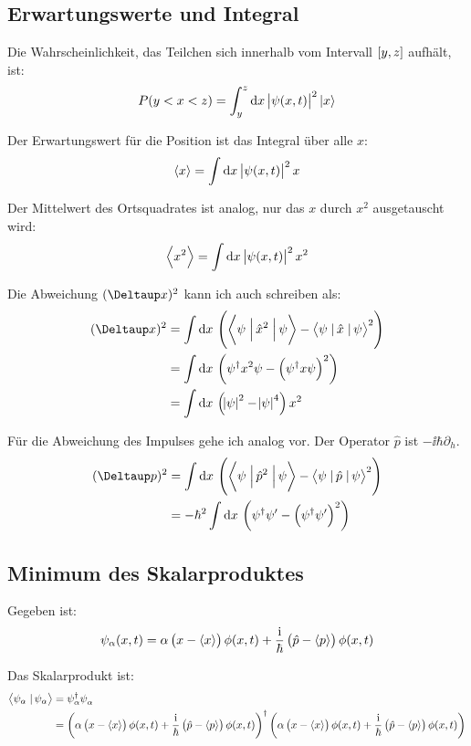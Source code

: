 \subsection{Erwartungswerte und Integral}

Die Wahrscheinlichkeit, das Teilchen sich innerhalb vom Intervall $\intcc{y,
z}$ aufhält, ist:
\[
	P(y < x < z) = \int_y^z \dif x \, \abs{\psi(x, t)}^2 \ket x
\]

Der Erwartungswert für die Position ist das Integral über alle $x$:
\[
	\bracket x = \int\dif x \, \abs{\psi(x, t)}^2 x
\]

Der Mittelwert des Ortsquadrates ist analog, nur das $x$ durch $x^2$
ausgetauscht wird:
\[
	\bracket{x^2} = \int\dif x \, \abs{\psi(x, t)}^2 x^2
\]

Die Abweichung $(\Deltaup x)^2$ kann ich auch schreiben als:
\cite{wikipedia-quantum_operators}
\begin{align*}
	(\Deltaup x)^2
	&= \int \dif x \, \del{\braproket{\psi}{\hat x^2}{\psi} - \braproket{\psi}{\hat x}{\psi}^2} \\
	&= \int \dif x \, \del{\psi^\dagger x^2 \psi - \del{\psi^\dagger x \psi}^2} \\
	&= \int \dif x \, \del{\abs{\psi}^2 - \abs\psi^4} x^2
\end{align*}

Für die Abweichung des Impulses gehe ich analog vor. Der Operator $\hat p$ ist
$- \ii \hbar \partial_h$.
\begin{align*}
	(\Deltaup p)^2
	&= \int \dif x \, \del{\braproket{\psi}{\hat p^2}{\psi} - \braproket{\psi}{\hat p}{\psi}^2} \\
	&= - \hbar^2 \int \dif x \, \del{\psi^\dagger \psi' - \del{\psi^\dagger \psi'}^2} \\
\end{align*}

\fehlt

\subsection{Minimum des Skalarproduktes}

Gegeben ist:
\[
	\psi_\alpha(x, t) = \alpha \del{x - \bracket x} \phi(x, t) + \frac\ii\hbar \del{\hat p - \bracket p} \phi(x, t)
\]

Das Skalarprodukt ist:
\begin{align*}
	\braket{\psi_\alpha}{\psi_\alpha}
	&= \psi_\alpha^\dagger \psi_\alpha^{} \\
	&= \del{\alpha \del{x - \bracket x} \phi(x, t) + \frac\ii\hbar \del{\hat p - \bracket p} \phi(x, t)}^\dagger \del{\alpha \del{x - \bracket x} \phi(x, t) + \frac\ii\hbar \del{\hat p - \bracket p} \phi(x, t)} \\
\end{align*}

